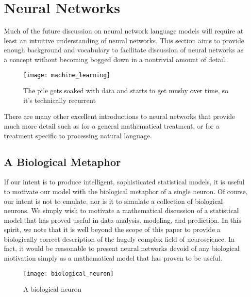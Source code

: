 \section{Neural Networks}\label{sec:introduction:neural-networks}

Much of the future discussion on neural network language models will require at least an intuitive understanding of neural networks.
This section aims to provide enough background and vocabulary to facilitate discussion of neural networks as a concept without becoming bogged down in a nontrivial amount of detail.
\begin{figure}[h]
    \centering
    \texttt{[image: machine\_learning]}
    \caption{The pile gets soaked with data and starts to get mushy over time, so it's technically recurrent \cite{xkcd_machine_learning}}\label{fig:neural-networks:xkcd-machine-learning}
\end{figure}
There are many other excellent introductions to neural networks that provide much more detail such as \cite{goodfellow_bengio_courville_2016} for a general mathematical treatment, or \cite{goldberg_2017} for a treatment specific to processing natural language.

\subsection{A Biological Metaphor}\label{sec:neural-networks-biological-metaphor}

If our intent is to produce intelligent, sophisticated statistical models, it is useful to motivate our model with the biological metaphor of a single neuron.
Of course, our intent is not to emulate, nor is it to simulate a collection of biological neurons.
We simply wish to motivate a mathematical discussion of a statistical model that has proved useful in data analysis, modeling, and prediction.
In this spirit, we note that it is well beyond the scope of this paper to provide a biologically correct description of the hugely complex field of neuroscience.
In fact, it would be reasonable to present neural networks devoid of any biological motivation simply as a mathematical model that has proven to be useful.

\begin{figure}[h]
    \centering
    \texttt{[image: biological\_neuron]}
    \caption{A biological neuron \cite{bio_neuron}}\label{fig:neural-networks:biological-neuron}
\end{figure}

